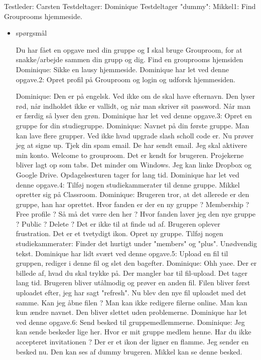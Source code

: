 \documentclass[12pt]{article}
\begin{document}
Testleder: Carsten
Testdeltager: Dominique
Testdeltager "dummy": Mikkel1: Find Grouprooms hjemmeside.

\begin{itemize} 
\item {sp\o rgsm\aa l}

Du har f\aa et en opgave med din gruppe og I skal bruge Grouproom, for at snakke/arbejde sammen din grupp og dig. Find en grouprooms hjemsiden
Dominique: Sikke en lausy hjemmeside.
Dominique har let ved denne opgave.2: Opret profil på Grouproom og login og udforsk hjemmesiden.

Dominique: Den er på engelsk. Ved ikke om de skal have efternavn. Den lyser rød, når indholdet ikke er vallidt, og når man skriver sit password. Når man er færdig så lyser den grøn.
Dominique har let ved denne opgave.3: Opret en gruppe for din studiegruppe.
Dominique: Navnet på din første gruppe. Man kan lave flere grupper. Ved ikke hvad upgrade slash scholl code er.
Nu prøver jeg at signe up.
Tjek din spam email. De har sendt email.
Jeg skal aktivere min konto.
Welcome to grouproom.
Det er kendt for brugeren. Projekerne bliver lagt op som tabs. Det minder om Windows.
Jeg kan linke Dropbox og Google Drive.
Opdagelsesturen tager for lang tid.
Dominique har let ved denne opgave.4: Tilføj nogen studiekammerater til denne gruppe.
Mikkel opretter sig på Classroom.
Dominique: Brugeren tror, at det allerede er den gruppe, han har oprettet.
Hvor fanden er der en ny gruppe ?
Membership ? Free profile ? Så må det være den her ?
Hvor fanden laver jeg den nye gruppe ? Public ? Delete ?
Det er ikke til at finde ud af. Brugeren oplever frustration.
Det er et tvetydigt ikon. Opret ny gruppe.
Tilføj nogen studiekammerater: Finder det hurtigt under "members" og "plus". Unødvendig tekst.
Dominique har lidt svært ved denne opgave.5: Upload en fil til gruppen, rediger i denne fil og slet den bagefter.
Dominique: Ohh yaee. Der er billede af, hvad du skal trykke på. Der mangler bar til fil-upload. Det tager lang tid. Brugeren bliver utålmodig og prøver en anden fil.
Filen bliver først uploadet efter, jeg har sagt "refresh".
Nu blev den nye fil uploadet med det samme.
Kan jeg åbne filen ? Man kan ikke redigere filerne online. Man kan kun ændre navnet.
Den bliver slettet uden problemerne.
Dominique har let ved denne opgave.6: Send besked til gruppemedlemmerne.
Dominique: Jeg kan sende beskeder lige her. Hvor er mit gruppe medlem henne. Har du ikke accepteret invitationen ? Der er et ikon der ligner en flamme. Jeg sender en besked nu. Den kan ses af dummy brugeren. Mikkel kan se denne besked.

\end{itemize}
\end{document}
